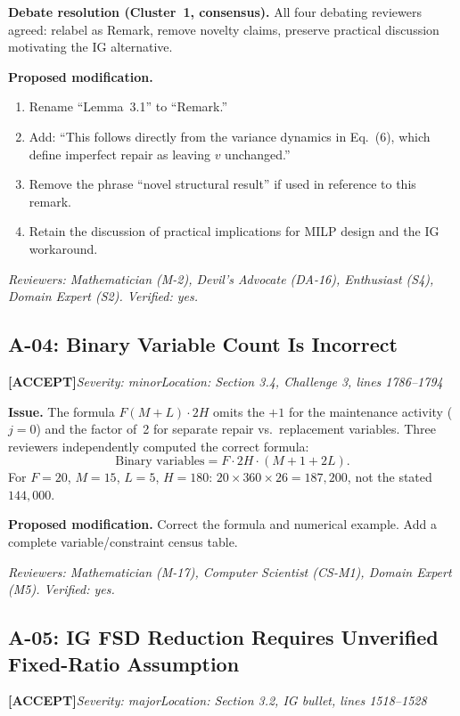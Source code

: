 \documentclass[11pt,a4paper]{article}
\newcommand{\acceptlabel}{\textbf{\textcolor{acceptgreen}{[ACCEPT]}}}
\begin{document}
\textbf{Debate resolution (Cluster~1, consensus).} All four debating reviewers agreed: relabel as Remark, remove novelty claims, preserve practical discussion motivating the IG alternative.

\textbf{Proposed modification.}
\begin{enumerate}[nosep,leftmargin=1.5em]
  \item Rename ``Lemma~3.1'' to ``Remark.''
  \item Add: ``This follows directly from the variance dynamics in Eq.~(6), which define imperfect repair as leaving $v$ unchanged.''
  \item Remove the phrase ``novel structural result'' if used in reference to this remark.
  \item Retain the discussion of practical implications for MILP design and the IG workaround.
\end{enumerate}

\textit{Reviewers: Mathematician (M-2), Devil's Advocate (DA-16), Enthusiast (S4), Domain Expert (S2). Verified: yes.}

\bigskip

\subsection{A-04: Binary Variable Count Is Incorrect}
\acceptlabel\quad\textit{Severity: minor}\quad\textit{Location: Section 3.4, Challenge 3, lines 1786--1794}

\textbf{Issue.} The formula $F(M+L)\cdot 2H$ omits the $+1$ for the maintenance activity ($j=0$) and the factor of~2 for separate repair vs.\ replacement variables. Three reviewers independently computed the correct formula:
\[
\text{Binary variables} = F\cdot 2H\cdot(M+1+2L).
\]
For $F=20$, $M=15$, $L=5$, $H=180$: $20\times 360\times 26 = 187{,}200$, not the stated $144{,}000$.

\textbf{Proposed modification.} Correct the formula and numerical example. Add a complete variable/constraint census table.

\textit{Reviewers: Mathematician (M-17), Computer Scientist (CS-M1), Domain Expert (M5). Verified: yes.}

\bigskip

\subsection{A-05: IG FSD Reduction Requires Unverified Fixed-Ratio Assumption}
\acceptlabel\quad\textit{Severity: major}\quad\textit{Location: Section 3.2, IG bullet, lines 1518--1528}
\end{document}
